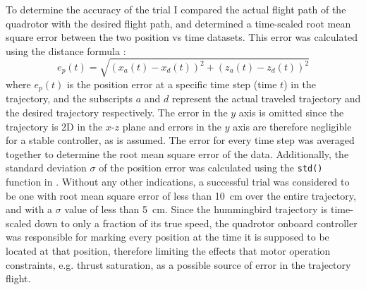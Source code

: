 To determine the accuracy of the trial I compared the actual flight path of the quadrotor with the desired flight path, and determined a time-scaled root mean square error between the two position vs time datasets. This error was calculated using the distance formula :
\begin{equation}
e_p(t) = \sqrt{(x_a(t)-x_d(t))^2 + (z_a(t)-z_d(t))^2}
\label{eq:demonstration-1}
\end{equation}
where $e_p(t)$ is the position error at a specific time step (time $t$) in the trajectory, and the subscripts $a$ and $d$ represent the actual traveled trajectory and the desired trajectory respectively. The error in the $y$ axis is omitted since the trajectory is 2D in the $x$-$z$ plane and errors in the $y$ axis are therefore negligible for a stable controller, as is assumed. The error for every time step was averaged together to determine the root mean square error of the data. Additionally, the standard deviation $\sigma$ of the position error was calculated using the \lstinline{std()} function in \MATLAB. Without any other indications, a successful trial was considered to be one with root mean square error of less than \SI{10}{\centi\meter} over the entire trajectory, and with a $\sigma$ value of less than \SI{5}{\centi\meter}. Since the hummingbird trajectory is time-scaled down to only a fraction of its true speed, the quadrotor onboard controller was responsible for marking every position at the time it is supposed to be located at that position, therefore limiting the effects that motor operation constraints, e.g. thrust saturation, as a possible source of error in the trajectory flight.






